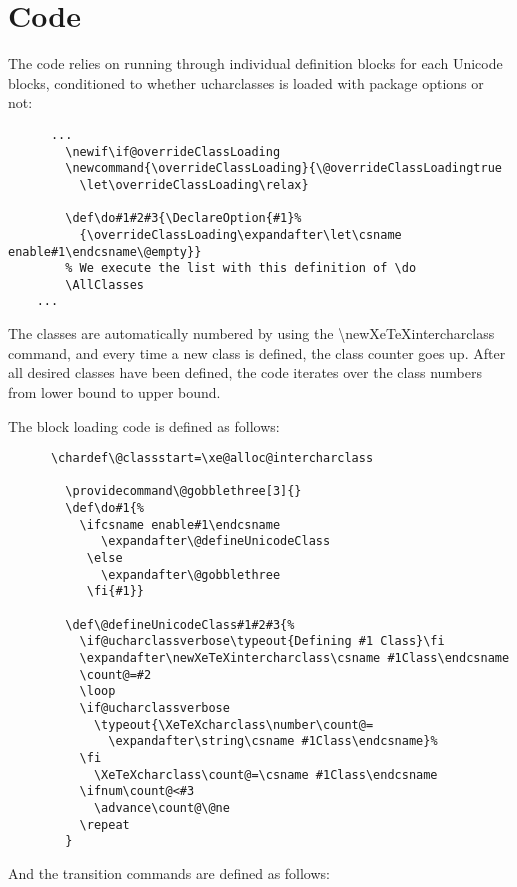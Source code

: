 \documentclass{article}
\begin{document}
	\pagebreak
	\section{Code}

		The code relies on running through individual definition blocks for each Unicode blocks, conditioned to whether ucharclasses is loaded with package options or not:

		\disableTransitionRules
		\begin{verbatim}
	  ...
		\newif\if@overrideClassLoading
		\newcommand{\overrideClassLoading}{\@overrideClassLoadingtrue
		  \let\overrideClassLoading\relax}

		\def\do#1#2#3{\DeclareOption{#1}%
		  {\overrideClassLoading\expandafter\let\csname enable#1\endcsname\@empty}}
		% We execute the list with this definition of \do
		\AllClasses
  	...
		\end{verbatim}
		\enableTransitionRules

		The classes are automatically numbered by using the \textbackslash newXeTeXintercharclass command, and every time a new class is defined, the class counter goes up. After all desired classes have been defined, the code iterates over the class numbers from lower bound to upper bound.

		The block loading code is defined as follows:

		\disableTransitionRules
		\begin{verbatim}
	  \chardef\@classstart=\xe@alloc@intercharclass

		\providecommand\@gobblethree[3]{}
		\def\do#1{%
		  \ifcsname enable#1\endcsname
		     \expandafter\@defineUnicodeClass
		   \else
		     \expandafter\@gobblethree
		   \fi{#1}}

		\def\@defineUnicodeClass#1#2#3{%
		  \if@ucharclassverbose\typeout{Defining #1 Class}\fi
		  \expandafter\newXeTeXintercharclass\csname #1Class\endcsname
		  \count@=#2
		  \loop
		  \if@ucharclassverbose
		    \typeout{\XeTeXcharclass\number\count@=
		      \expandafter\string\csname #1Class\endcsname}%
		  \fi
		    \XeTeXcharclass\count@=\csname #1Class\endcsname
		  \ifnum\count@<#3
		    \advance\count@\@ne
		  \repeat
		}
		\end{verbatim}
		\enableTransitionRules

		And the transition commands are defined as follows:
\end{document}
